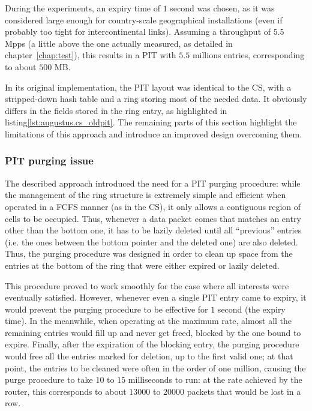 \documentclass[12pt,a4paper,twoside]{book}
\begin{document}
During the experiments, an expiry time of $1$ second was chosen, as it was considered large enough for country-scale geographical installations (even if probably too tight for intercontinental links). Assuming a throughput of $5.5$ \gls{Mpps} (a little above the one actually measured, as detailed in chapter~\ref{chap:test}), this results in a PIT with $5.5$ millions entries, corresponding to about $500$ MB.

In its original implementation, the PIT layout was identical to the CS, with a stripped-down hash table and a ring storing most of the needed data. It obviously differs in the fields stored in the ring entry, as highlighted in listing\ref{lst:augustus.cs_oldpit}. The remaining parts of this section highlight the limitations of this approach and introduce an improved design overcoming them.

\subsubsection{PIT purging issue}\label{sec:augustus.pit.purge}
The described approach introduced the need for a PIT purging procedure: while the management of the ring structure is extremely simple and efficient when operated in a FCFS manner (as in the CS), it only allows a contiguous region of cells to be occupied. Thus, whenever a data packet comes that matches an entry other than  the bottom one, it has to be lazily deleted until all ``previous'' entries (i.e. the ones between the bottom pointer and the deleted one) are also deleted.  
Thus, the purging procedure was designed in order to clean up space from the entries at the bottom of the ring that were either expired or lazily deleted.

This procedure proved to work smoothly for the case where all interests were eventually satisfied. However, whenever even a single PIT entry came to expiry, it would prevent the purging procedure to be effective for $1$ second (the expiry time). In the meanwhile, when operating at the maximum rate, almost all the remaining entries would fill up and never get freed, blocked by the one bound to expire. Finally, after the expiration of the blocking entry, the purging procedure would free all the entries marked for deletion, up to the first valid one; at that point, the entries to be cleaned were often in the order of one million, causing the purge procedure to take $10$ to $15$ milliseconds to run: at the rate achieved by the router, this corresponds to about $13000$ to $20000$ packets that would be lost in a row.
\end{document}
